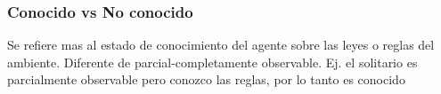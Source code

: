 \subsubsection*{Conocido vs No conocido}
Se refiere mas al estado de conocimiento del agente sobre las leyes o reglas del ambiente. Diferente de parcial-completamente observable. Ej. el solitario es parcialmente observable pero conozco las reglas, por lo tanto es conocido

